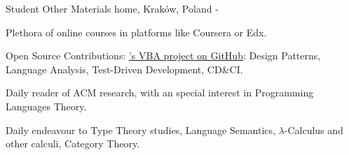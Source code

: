 \begin{cventries}
\cventry
	{Student}
	{Other Materials}
	{home, Kraków, Poland}
	{-}
	{
		\begin{cvitems} %
            \item {Plethora of online courses in platforms like Coursera or Edx.}
            \item {Open Source Contributions: \href{https://github.com/rubberduck-vba/Rubberduck}{'s VBA project on GitHub}: Design Patterns, Language Analysis, Test-Driven Development, CD\&CI.}
            \item {Daily reader of ACM research, with an special interest in Programming Languages Theory.}
			\item {Daily endeavour to Type Theory studies, Language Semantics, $\lambda$-Calculus and other calculi, Category Theory.}
        \end{cvitems}
	}

\end{cventries}

